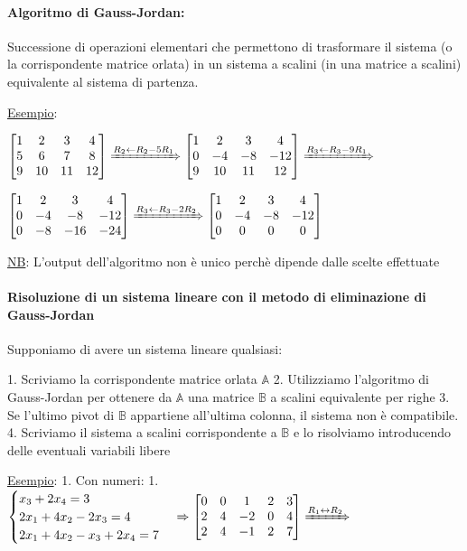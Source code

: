 \documentclass{article}
\begin{document}
\paragraph*{Algoritmo di Gauss-Jordan:}
Successione di operazioni elementari che permettono di trasformare il sistema (o la corrispondente matrice orlata) in un sistema a scalini (in una matrice a scalini) equivalente al sistema di partenza.

\ul{Esempio}:

$\begin{bmatrix}
  1&2&3&4\\
  5&6&7&8\\
  9&10&11&12
\end{bmatrix}\xRightarrow{R_2\leftarrow R_2-5R_1}
\begin{bmatrix}
  1&2&3&4\\
  0&-4&-8&-12\\
  9&10&11&12
\end{bmatrix}\xRightarrow{R_3\leftarrow R_3-9R_1}$

$\begin{bmatrix}
  1&2&3&4\\
  0&-4&-8&-12\\
  0&-8&-16&-24
\end{bmatrix}\xRightarrow{R_3\leftarrow R_3-2R_2}
\begin{bmatrix}
  1&2&3&4\\
  0&-4&-8&-12\\
  0&0&0&0
\end{bmatrix}$

\ul{NB}: L'output dell'algoritmo non è unico perchè dipende dalle scelte effettuate

\paragraph*{Risoluzione di un sistema lineare con il metodo di eliminazione di Gauss-Jordan}

Supponiamo di avere un sistema lineare qualsiasi:

1. Scriviamo la corrispondente matrice orlata $\mathbb{A}$
2. Utilizziamo l'algoritmo di Gauss-Jordan per ottenere da $\mathbb{A}$ una matrice $\mathbb{B}$ a scalini equivalente per righe
3. Se l'ultimo pivot di $\mathbb{B}$ appartiene all'ultima colonna, il sistema non è compatibile.
4. Scriviamo il sistema a scalini corrispondente a $\mathbb{B}$ e lo risolviamo introducendo delle eventuali variabili libere

\ul{Esempio}:
1. Con numeri:
   1.  $\begin{cases}
         x_3+2x_4=3\\
         2x_1+4x_2-2x_3=4\\
         2x_1+4x_2-x_3+2x_4=7
       \end{cases}\Rightarrow
       \begin{bmatrix}
         0&0&1&2&3\\
         2&4&-2&0&4\\
         2&4&-1&2&7
       \end{bmatrix}\xRightarrow{R_1\leftrightarrow R_2}$
\end{document}
